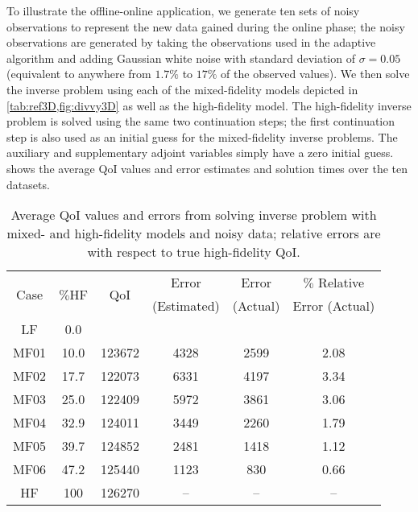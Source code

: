 To illustrate the offline-online application, we generate ten sets of noisy observations to represent the new data gained during the online phase; the noisy observations are generated by taking the observations used in the adaptive algorithm and adding Gaussian white noise with standard deviation of $\sigma=0.05$ (equivalent to anywhere from $1.7\%$ to $17\%$ of the observed values). We then solve the inverse problem using each of the mixed-fidelity models depicted in \cref{tab:ref3D,fig:divvy3D} as well as the high-fidelity model. The high-fidelity inverse problem is solved using the same two continuation steps; the first continuation step is also used as an initial guess for the mixed-fidelity inverse problems. The auxiliary and supplementary adjoint variables simply have a zero initial guess.  shows the average QoI values and error estimates and solution times over the ten datasets.
%
\begin{table}
\caption{Average QoI values and errors from solving inverse problem with mixed- and high-fidelity models and noisy data; relative errors are with respect to true high-fidelity QoI.}
\label{tab:ref3D_newdata_QoI}
\centering
\begin{tabular}{|c|c|c|c|c|c|}
\hline
\multirow{2}{*}{Case} & \multirow{2}{*}{$\%$HF} & \multirow{2}{*}{QoI} & Error & Error & $\%$ Relative  \\ 
& & & (Estimated) & (Actual) & Error (Actual) \\ \hline
LF   & 0.0  &  &  &  &  \\
MF01 & 10.0 & 123672 & 4328 & 2599 & 2.08  \\
MF02 & 17.7 & 122073 & 6331 & 4197 & 3.34  \\
MF03 & 25.0 & 122409 & 5972 & 3861 & 3.06  \\
MF04 & 32.9 & 124011 & 3449 & 2260 & 1.79  \\
MF05 & 39.7 & 124852 & 2481 & 1418 & 1.12  \\
MF06 & 47.2 & 125440 & 1123 & 830  & 0.66  \\ 
HF   & 100  & 126270 & --   & --   & --     \\ \hline
\end{tabular}
\end{table}
%
